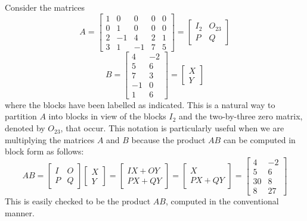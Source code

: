 \documentclass{ximera}
\begin{document}
Consider the matrices
\begin{equation*}
A = \left[ \begin{array}{rr|rrr}
1 & 0 & 0 & 0 & 0 \\
0 & 1 & 0 & 0 & 0 \\
\hline
2 & -1 & 4 & 2 & 1 \\
3 & 1 & -1 & 7 & 5
\end{array} \right] = \left[ \begin{array}{cc}
I_{2} & O_{23} \\
P & Q
\end{array} \right]
\end{equation*}
\begin{equation*}
B = \left[ \begin{array}{rr}
4 & -2 \\
5 & 6 \\
\hline
7 & 3 \\
-1 & 0 \\
1 & 6
\end{array} \right] = \left[ \begin{array}{c}
X \\
Y
\end{array} \right]
\end{equation*}
where the blocks have been labelled as indicated. This is a natural way to partition $A$ into blocks in view of the blocks $I_{2}$ and the two-by-three zero matrix, denoted by $O_{23}$, that occur. This notation is particularly useful when we are multiplying the matrices $A$ and $B$ because the product $AB$ can be computed in block form as follows:
\begin{equation*}
AB = \left[ \begin{array}{cc}
I & O \\
P & Q
\end{array} \right] \left[ \begin{array}{c}
X \\
Y
\end{array} \right] = \left[ \begin{array}{c}
IX + OY \\
PX + QY
\end{array} \right] = \left[ \begin{array}{c}
X \\
PX + QY
\end{array} \right] = \left[ \begin{array}{rr}
4 & -2 \\
5 & 6 \\
\hline
30 & 8 \\
8 & 27
\end{array} \right]
\end{equation*}
This is easily checked to be the product $AB$, computed in the conventional manner.
\end{document}
